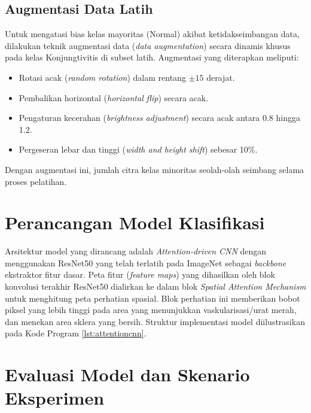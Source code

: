 \subsection{Augmentasi Data Latih}
\label{subsec:augmentasi-data-latih}

Untuk mengatasi bias kelas mayoritas (Normal) akibat ketidakseimbangan data, dilakukan teknik augmentasi data (\textit{data augmentation}) secara dinamis khusus pada kelas Konjungtivitis di subset latih. Augmentasi yang diterapkan meliputi:
\begin{itemize}
  \item Rotasi acak (\textit{random rotation}) dalam rentang $\pm 15$ derajat.
  \item Pembalikan horizontal (\textit{horizontal flip}) secara acak.
  \item Pengaturan kecerahan (\textit{brightness adjustment}) secara acak antara 0.8 hingga 1.2.
  \item Pergeseran lebar dan tinggi (\textit{width and height shift}) sebesar 10\%.
\end{itemize}
Dengan augmentasi ini, jumlah citra kelas minoritas seolah-olah seimbang selama proses pelatihan.

\section{Perancangan Model Klasifikasi}
\label{sec:perancangan-model}

Arsitektur model yang dirancang adalah \textit{Attention-driven CNN} dengan menggunakan ResNet50 yang telah terlatih pada ImageNet sebagai \textit{backbone} ekstraktor fitur dasar. Peta fitur (\textit{feature maps}) yang dihasilkan oleh blok konvolusi terakhir ResNet50 dialirkan ke dalam blok \textit{Spatial Attention Mechanism} untuk menghitung peta perhatian spasial. Blok perhatian ini memberikan bobot piksel yang lebih tinggi pada area yang menunjukkan vaskularisasi/urat merah, dan menekan area sklera yang bersih. Struktur implementasi model diilustrasikan pada Kode Program \ref{lst:attentioncnn}.



\section{Evaluasi Model dan Skenario Eksperimen}
\label{sec:evaluasi-model}


